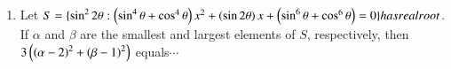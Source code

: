 \documentclass[journal,12pt,twocolumn]{IEEEtran}
\theoremstyle{remark}
\begin{document}
\begin{enumerate}[start=16]
    \item Let $S = \{ \sin^2 2\theta:\left(\sin^4 \theta +\cos^4
	    \theta\right)x^2+\left( \sin2 \theta\right)x +\left(\sin^6 \theta+  \cos^6\theta\right) = 0 \} has real root$. If $\alpha$ and $\beta$ are the smallest and largest elements of $S$, respectively, then $3\left(\left(\alpha - 2\right)^2 + \left(\beta - 1\right)^2\right)$ equals$\cdots$
    \hfill{}



\end{enumerate}
\end{document}
